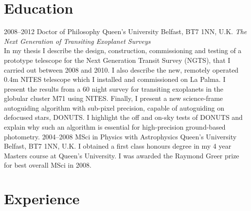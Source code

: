 \documentclass[print]{friggeri-cv} %
\begin{document}
\section{Education}

\begin{entrylist}
\entry
{2008--2012}
{Doctor {\normalfont of Philosophy}}
{Queen's University Belfast, BT7 1NN, U.K.}
{\emph{The Next Generation of Transiting Exoplanet Surveys} \\ In my thesis I describe the design, construction, commissioning and testing of a prototype telescope for the Next Generation Transit Survey (NGTS), that I carried out between 2008 and 2010. I also describe the new, remotely operated 0.4m NITES telescope which I installed and commissioned on La Palma. I present the results from a 60 night survey for transiting exoplanets in the globular cluster M71 using NITES. Finally, I present a new science-frame autoguiding algorithm with sub-pixel precision, capable of autoguiding on defocused stars, DONUTS. I highlight the off and on-sky tests of DONUTS and explain why such an algorithm is essential for high-precision ground-based photometry.}
\entry
{2004--2008}
{MSci {\normalfont in Physics with Astrophysics}}
{Queen's University Belfast, BT7 1NN, U.K.}
{I obtained a first class honours degree in my 4 year Masters course at Queen's University. I was awarded the Raymond Greer prize for best overall MSci in 2008.}
\end{entrylist}


\section{Experience}
\end{document}
